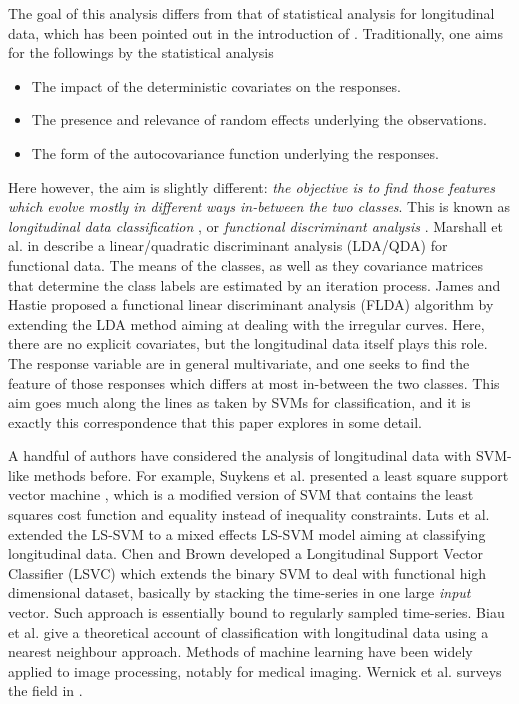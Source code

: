 \documentclass[12pt,a4paper]{article}%
\begin{document}
The goal of this analysis differs from that of statistical analysis
for longitudinal data,
which has been pointed out in the introduction of \cite{diggle2002analysis}.
Traditionally, one aims for the followings by the statistical analysis
\begin{itemize}
\item The impact of the deterministic covariates on the responses.
\item The presence and relevance of random effects underlying the observations.
\item The form of the autocovariance function underlying the responses.
\end{itemize}
Here however, the aim is slightly different:
{\em the objective is to find those features which evolve mostly in different ways in-between the two classes}.
This is known as {\em longitudinal data classification} \cite{marsallbaron00},
or {\em functional discriminant analysis} \cite{jameshastie2001,ramsaysilverman2005}.
Marshall et al. in \cite{marsallbaron00} describe a linear/quadratic discriminant analysis (LDA/QDA) for functional data.
The means of the classes, as well as they covariance matrices that determine the class labels are estimated by an iteration process.
James and Hastie proposed a functional linear discriminant analysis (FLDA) \cite{jameshastie2001} algorithm by extending the LDA method aiming at dealing with the irregular curves.
Here, there are no explicit covariates,
but the longitudinal data itself plays this role.
The response variable are in general multivariate, and one seeks to find the feature of those responses which differs at most in-between the two classes.
This aim goes much along the lines as taken by SVMs for classification, and it is exactly this correspondence that this paper explores in some detail.





A handful of authors have considered the analysis of longitudinal data with SVM-like methods before.
For example,  Suykens et al. presented a least square support vector machine \cite{suykens1999least},
which is a modified version of SVM that contains the least squares cost function and equality instead of inequality constraints.
Luts et al. extended the LS-SVM to a mixed effects LS-SVM model \cite{luts2012mixedLSSVM} aiming at classifying longitudinal data.
Chen and Brown \cite{chen2011lsvc} developed a Longitudinal Support Vector Classifier (LSVC) which extends the binary SVM
to deal with functional high dimensional dataset, basically by stacking the time-series in one large {\em input} vector.
Such approach is essentially bound to regularly sampled time-series.
Biau et al.  \cite{biau2005functional} give a theoretical account of classification with longitudinal data using a nearest neighbour approach.
Methods of machine learning have been widely applied to image processing, notably for medical imaging.
Wernick et al. surveys the field in \cite{Wernick2010MLimage}.
\end{document}
